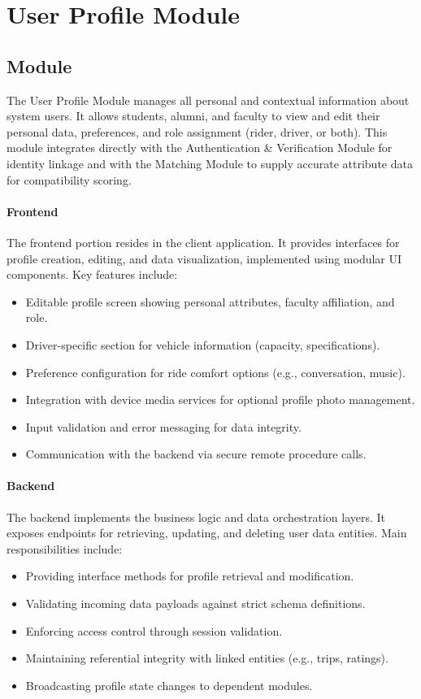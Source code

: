 \section{User Profile Module}

\subsection{Module}
The User Profile Module manages all personal and contextual information about system users. 
It allows students, alumni, and faculty to view and edit their personal data, preferences, and role assignment (rider, driver, or both). 
This module integrates directly with the Authentication \& Verification Module for identity linkage and with the Matching Module to supply accurate attribute data for compatibility scoring.

\paragraph{Frontend}
The frontend portion resides in the client application. 
It provides interfaces for profile creation, editing, and data visualization, implemented using modular UI components. 
Key features include:
\begin{itemize}
    \item Editable profile screen showing personal attributes, faculty affiliation, and role.
    \item Driver-specific section for vehicle information (capacity, specifications).
    \item Preference configuration for ride comfort options (e.g., conversation, music).
    \item Integration with device media services for optional profile photo management.
    \item Input validation and error messaging for data integrity.
    \item Communication with the backend via secure remote procedure calls.
\end{itemize}

\paragraph{Backend}
The backend implements the business logic and data orchestration layers. 
It exposes endpoints for retrieving, updating, and deleting user data entities. 
Main responsibilities include:
\begin{itemize}
    \item Providing interface methods for profile retrieval and modification.
    \item Validating incoming data payloads against strict schema definitions.
    \item Enforcing access control through session validation.
    \item Maintaining referential integrity with linked entities (e.g., trips, ratings).
    \item Broadcasting profile state changes to dependent modules.
\end{itemize}

